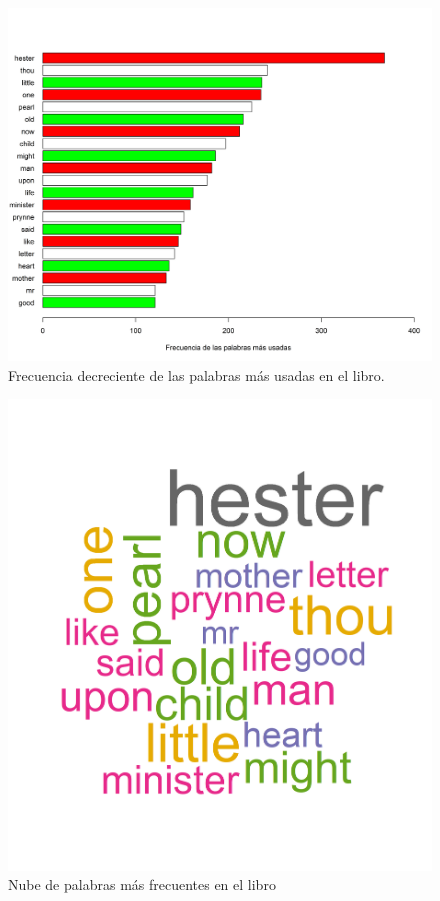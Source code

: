 \documentclass{article}
\begin{document}
\begin{figure}
\centering
\includegraphics[scale=0.6]{Figures/palabrasFiltradasDecr.png}
\caption{Frecuencia decreciente de las palabras más usadas en el libro.}
\label{palabrasfiltradasdec}
\end{figure}

\begin{figure}
\centering
\includegraphics[scale=0.8]{Figures/wordcloud.png}
\caption{Nube de palabras más frecuentes en el libro}
\label{worldcloud}
\end{figure}




\end{document}
